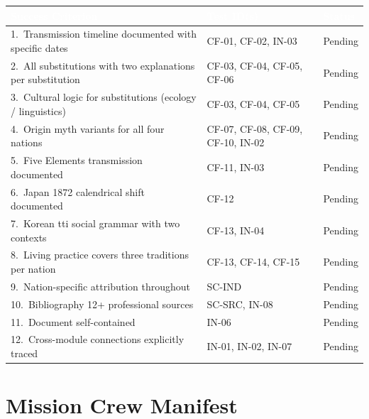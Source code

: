 \documentclass[11pt,letterpaper]{article}
\newcommand{\tableheader}[1]{\textbf{\sffamily\textcolor{white}{#1}}}
\begin{document}
\begin{center}
\begin{tabularx}{\textwidth}{XL{3.5cm}C{1.5cm}}
\toprule
{}
\tableheader{Success Criterion} & \tableheader{Test ID(s)} & \tableheader{Status} \\
.\ Transmission timeline documented with specific dates & CF-01, CF-02, IN-03 & Pending \\
2.\ All substitutions with two explanations per substitution & CF-03, CF-04, CF-05, CF-06 & Pending \\
3.\ Cultural logic for substitutions (ecology / linguistics) & CF-03, CF-04, CF-05 & Pending \\
4.\ Origin myth variants for all four nations & CF-07, CF-08, CF-09, CF-10, IN-02 & Pending \\
5.\ Five Elements transmission documented & CF-11, IN-03 & Pending \\
6.\ Japan 1872 calendrical shift documented & CF-12 & Pending \\
7.\ Korean tti social grammar with two contexts & CF-13, IN-04 & Pending \\
8.\ Living practice covers three traditions per nation & CF-13, CF-14, CF-15 & Pending \\
9.\ Nation-specific attribution throughout & SC-IND & Pending \\
10.\ Bibliography 12+ professional sources & SC-SRC, IN-08 & Pending \\
11.\ Document self-contained & IN-06 & Pending \\
12.\ Cross-module connections explicitly traced & IN-01, IN-02, IN-07 & Pending \\
\bottomrule
\end{tabularx}
\end{center}

\section{Mission Crew Manifest}
\end{document}
